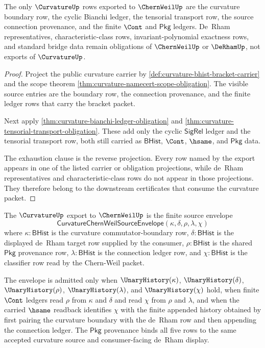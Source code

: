 \begin{theorem}
\label{thm:curvature-chernweil-visible-input-exhaustion}
The only $\CurvatureUp$ rows exported to $\ChernWeilUp$ are the curvature boundary row, the cyclic Bianchi ledger, the tensorial transport row, the source connection provenance, and the finite $\Cont$ and $\mathsf{Pkg}$ ledgers. De~Rham representatives, characteristic-class rows, invariant-polynomial exactness rows, and standard bridge data remain obligations of $\ChernWeilUp$ or $\DeRhamUp$, not exports of $\CurvatureUp$.
\end{theorem}
\begin{proof}
Project the public curvature carrier by \autoref{def:curvature-bhist-bracket-carrier} and the scope theorem \autoref{thm:curvature-namecert-scope-obligation}. The visible source entries are the boundary row, the connection provenance, and the finite ledger rows that carry the bracket packet.

Next apply \autoref{thm:curvature-bianchi-ledger-obligation} and \autoref{thm:curvature-tensorial-transport-obligation}. These add only the cyclic $\mathsf{SigRel}$ ledger and the tensorial transport row, both still carried as $\mathsf{BHist}$, $\Cont$, $\hsame$, and $\mathsf{Pkg}$ data.

The exhaustion clause is the reverse projection. Every row named by the export appears in one of the listed carrier or obligation projections, while de~Rham representatives and characteristic-class rows do not appear in those projections. They therefore belong to the downstream certificates that consume the curvature packet.
\end{proof}

\begin{definition}
\label{def:curvature-chernweil-source-envelope}
The $\CurvatureUp$ export to $\ChernWeilUp$ is the finite source envelope
$$
\mathsf{CurvatureChernWeilSourceEnvelope}(\kappa,\delta,\rho,\lambda,\chi)
$$
where $\kappa:\mathsf{BHist}$ is the curvature commutator-boundary row, $\delta:\mathsf{BHist}$ is the displayed de~Rham target row supplied by the consumer, $\rho:\mathsf{BHist}$ is the shared $\mathsf{Pkg}$ provenance row, $\lambda:\mathsf{BHist}$ is the connection ledger row, and $\chi:\mathsf{BHist}$ is the classifier row read by the Chern-Weil packet.

The envelope is admitted only when $\UnaryHistory(\kappa)$, $\UnaryHistory(\delta)$, $\UnaryHistory(\rho)$, $\UnaryHistory(\lambda)$, and $\UnaryHistory(\chi)$ hold, when finite $\Cont$ ledgers read $\rho$ from $\kappa$ and $\delta$ and read $\chi$ from $\rho$ and $\lambda$, and when the carried $\hsame$ readback identifies $\chi$ with the finite appended history obtained by first pairing the curvature boundary with the de~Rham row and then appending the connection ledger. The $\mathsf{Pkg}$ provenance binds all five rows to the same accepted curvature source and consumer-facing de~Rham display.
\end{definition}

